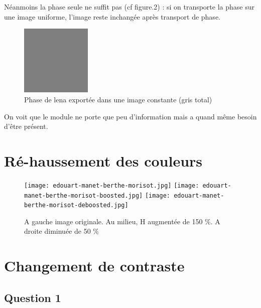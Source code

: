\documentclass{article}
\begin{document}
Néanmoins la phase seule ne suffit pas (cf figure.2) : si on transporte la phase sur une image uniforme, l'image reste inchangée après transport de phase. 

\begin{figure}[h]

	\includegraphics[width=0.3\textwidth]{phase_swapping_in_grey_image.jpg}

  \caption{Phase de lena exportée dans une image constante (gris total)}
\end{figure}


On voit que le module ne porte que peu d'information mais a quand même besoin d'être présent. 


\section{Ré-haussement des couleurs}


\begin{figure}[h]

	\texttt{[image: edouart-manet-berthe-morisot.jpg]}
	\texttt{[image: edouart-manet-berthe-morisot-boosted.jpg]}
	\texttt{[image: edouart-manet-berthe-morisot-deboosted.jpg]}
  \caption{A gauche image originale. Au milieu, H augmentée de 150 \%. A droite diminuée de 50 \%}
\end{figure}



\section{Changement de contraste}

\subsection*{Question 1}
\end{document}
